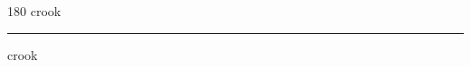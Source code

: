 
\begin{frame}
\begin{center}
\begin{turn}{180}
{\fontsize{2.5cm}{1em}\selectfont crook}
\end{turn}
\vspace{1em}\par  
\hrule
\vspace{1em}\par  
{\fontsize{2.5cm}{1em}\selectfont crook}
\end{center}
\end{frame}
